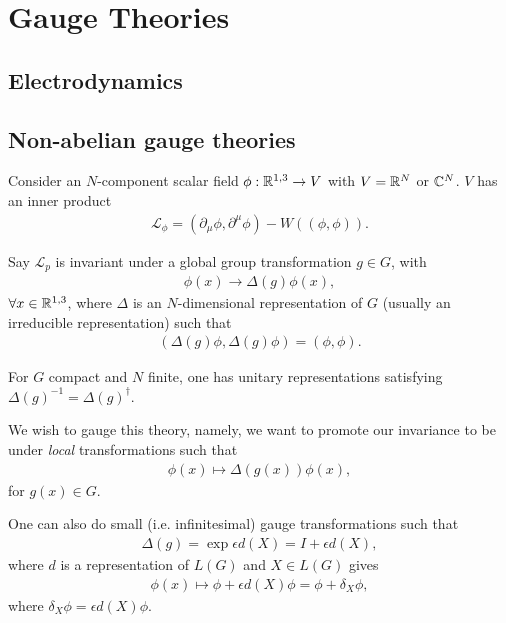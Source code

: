 
\section{Gauge Theories}

\subsection{Electrodynamics}

\subsection{Non-abelian gauge theories}

Consider an $N$-component scalar field $\phi : \mathbb{R}^{1,3} \to V$ with $V = \mathbb{R}^{N}$ or $\mathbb{C}^{N}$. $V$ has an inner product
\begin{align}
    \mathcal{L}_{\phi} = \left( \partial_\mu \phi, \partial^{\mu} \phi \right) - W \left( \left( \phi, \phi \right)  \right) 
.\end{align}

Say $\mathcal{L}_p$ is invariant under a global group transformation $g \in G$, with
\begin{align}
    \phi \left( x \right) \to \Delta \left( g \right) \phi \left( x \right) 
,\end{align}
$\forall x \in \mathbb{R}^{1,3}$, where $\Delta$ is an $N$-dimensional representation of $G$ (usually an irreducible representation) such that
\begin{align}
    \left( \Delta \left( g \right) \phi, \Delta \left( g \right) \phi \right) = \left( \phi, \phi \right) 
.\end{align}

For $G$ compact and $N$ finite, one has unitary representations satisfying $\Delta \left( g \right)^{-1} = \Delta \left( g \right)^{\dag}$.

We wish to gauge this theory, namely, we want to promote our invariance to be under \emph{local} transformations such that
\begin{align}
    \phi \left( x \right) \mapsto \Delta \left( g\left( x \right)  \right)  \phi \left( x \right) 
,\end{align}
for $g\left( x \right) \in G$. 

One can also do small (i.e. infinitesimal) gauge transformations such that
\begin{align}
    \Delta \left( g \right) = \exp \epsilon d \left( X \right)  = I + \epsilon d \left( X \right) 
,\end{align}
where $d$ is a representation of $L \left( G \right) $ and $X \in L \left( G \right) $ gives
\begin{align}
    \phi \left( x \right) \mapsto \phi + \epsilon d\left( X \right) \phi = \phi + \delta_X \phi
,\end{align}
where $\delta_X \phi = \epsilon d\left( X \right) \phi$.

